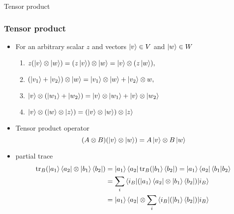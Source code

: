 \documentclass[9pt]{beamer}
\begin{document}
    \begin{section}{Tensor product}
        \begin{frame}
            \frametitle{Tensor product}
            \begin{itemize}
                \item For an arbitrary scalar $z$ and vectors $\ket v \in V$ and $\ket w \in W$
                \begin{enumerate}
                    \item $z(\ket v \otimes \ket w) = (z \ket v) \otimes \ket w = \ket v \otimes (z \ket w),$
                    \item $(\ket{v_1} + \ket{v_2}) \otimes \ket w = \ket{v_1} \otimes \ket w + \ket{v_2} \otimes w,$
                    \item $\ket v \otimes (\ket{w_1} + \ket{w_2}) = \ket v \otimes \ket{w_1} + \ket v \otimes \ket{w_2}$
                    \item $\ket v \otimes (\ket w \otimes \ket z) = (\ket v \otimes \ket w) \otimes \ket z$ 
                \end{enumerate}
                \item Tensor product operator 
                $$( A \otimes B ) (\ket v \otimes \ket w) = A \ket v \otimes B \ket w$$
                \item partial trace 
                $$ \begin{aligned} \operatorname{tr}_B (\ket{a_1} \bra{a_2} \otimes \ket{b_1} \bra{b_2}) &= \ket{a_1} \bra{a_2} \operatorname{tr}_B(\ket{b_1} \bra{b_2}) =  \ket{a_1} \bra{a_2} \braket{b_1|b_2} 
                \\ &= \sum_i \braket{i_B|(\ket{a_1} \bra{a_2} \otimes \ket{b_1} \bra{b_2})|i_B} \\  &=  \ket{a_1} \bra{a_2} \otimes\sum_i \braket{i_B|(\ket{b_1} \bra{b_2})|i_B}\\ \end{aligned}$$
            \end{itemize}
        
        \end{frame}
    \end{section}
\end{document}
